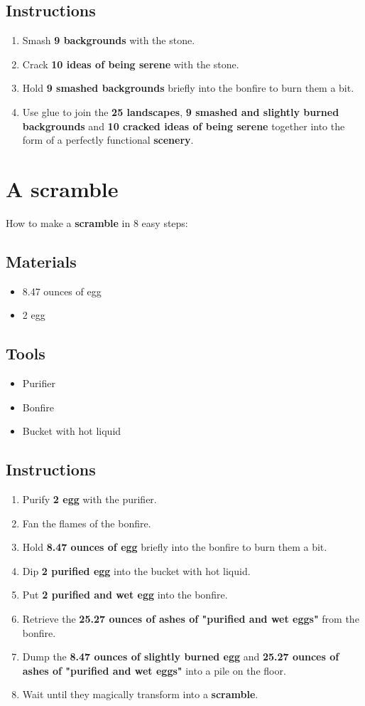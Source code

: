 \documentclass{article}
\begin{document}
\subsection{Instructions}\begin{enumerate}
\item 
Smash \textbf{9 backgrounds} with the stone.
\item 
Crack \textbf{10 ideas of being serene} with the stone.
\item 
Hold \textbf{9 smashed backgrounds} briefly into the bonfire to burn them a bit.
\item 
Use glue to join the \textbf{25 landscapes}, \textbf{9 smashed and slightly burned backgrounds} and \textbf{10 cracked ideas of being serene} together into the form of a perfectly functional \textbf{scenery}.
\end{enumerate}
\newpage
\section{A scramble}How to make a \textbf{scramble} in 8 easy steps:

\subsection{Materials}\begin{itemize}
\item 
8.47 ounces of egg
\item 
2 egg
\end{itemize}
\subsection{Tools}\begin{itemize}
\item 
Purifier
\item 
Bonfire
\item 
Bucket with hot liquid
\end{itemize}
\subsection{Instructions}\begin{enumerate}
\item 
Purify \textbf{2 egg} with the purifier.
\item 
Fan the flames of the bonfire.
\item 
Hold \textbf{8.47 ounces of egg} briefly into the bonfire to burn them a bit.
\item 
Dip \textbf{2 purified egg} into the bucket with hot liquid.
\item 
Put \textbf{2 purified and wet egg} into the bonfire.
\item 
Retrieve the \textbf{25.27 ounces of ashes of "purified and wet eggs"} from the bonfire.
\item 
Dump the \textbf{8.47 ounces of slightly burned egg} and \textbf{25.27 ounces of ashes of "purified and wet eggs"} into a pile on the floor.
\item 
Wait until they magically transform into a \textbf{scramble}.
\end{enumerate}
\newpage
\end{document}
